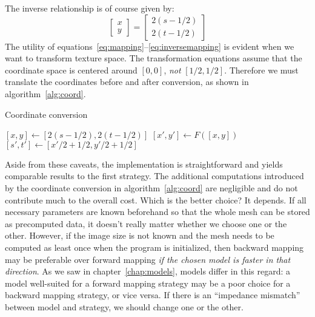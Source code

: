 \documentclass[english,12pt]{ifimaster}
\begin{document}
The inverse relationship is of course given by:
\begin{equation}
  \label{eq:inversemapping}
  \left[\begin{matrix}
      x\\
      y
    \end{matrix}\right]
  =
  \left[\begin{matrix}
      2(s - 1/2)\\
      2(t - 1/2)
    \end{matrix}\right]
\end{equation}
The utility of equations~\ref{eq:mapping}--\ref{eq:inversemapping} is
evident when we want to transform texture space. The transformation
equations assume that the coordinate space is centered around $[0,
0]$, \emph{not} $[1/2, 1/2]$. Therefore we must translate the
coordinates before and after conversion, as shown in
algorithm~\ref{alg:coord}.

\begin{algorithm}[h]
  \caption{Coordinate conversion}
  \label{alg:coord}
  \begin{algorithmic}
    \STATE $[x, y] \leftarrow [2(s - 1/2), 2(t - 1/2)]$ 
    \STATE $[x', y'] \leftarrow F([x, y])$ 
    \STATE $[s', t'] \leftarrow [x'/2 + 1/2, y'/2 + 1/2]$ 
  \end{algorithmic}
\end{algorithm}

Aside from these caveats, the implementation is straightforward and
yields comparable results to the first strategy. The additional
computations introduced by the coordinate conversion in
algorithm~\ref{alg:coord} are negligible and do not contribute much to
the overall cost. Which is the better choice? It depends. If all
necessary parameters are known beforehand so that the whole mesh can
be stored as precomputed data, it doesn't really matter whether we
choose one or the other. However, if the image size is not known and
the mesh needs to be computed as least once when the program is
initialized, then backward mapping may be preferable over forward
mapping \emph{if the chosen model is faster in that direction}. As we
saw in chapter~\ref{chap:models}, models differ in this regard: a
model well-suited for a forward mapping strategy may be a poor choice
for a backward mapping strategy, or vice versa. If there is an
``impedance mismatch'' between model and strategy, we should change
one or the other.
\end{document}
